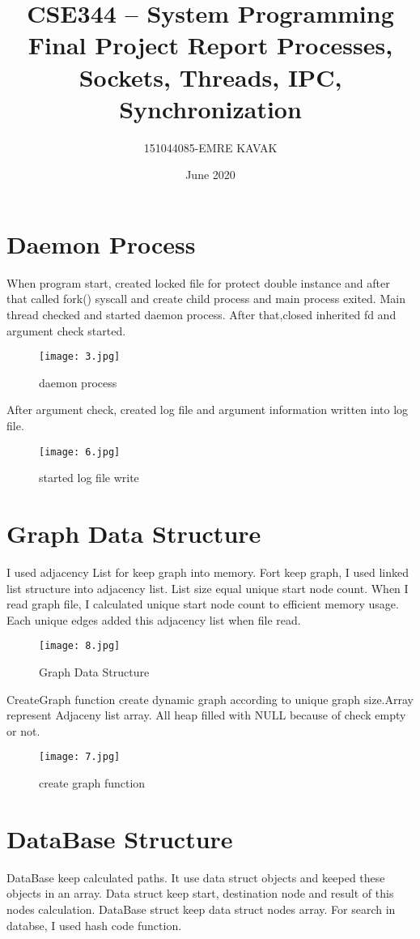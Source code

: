 \documentclass{article}
\title{CSE344 – System Programming Final Project Report Processes, Sockets, Threads, IPC, Synchronization}
\author{151044085-EMRE KAVAK}
\date{June 2020}
\begin{document}
\maketitle

\section{Daemon Process}
 When program start, created locked file for protect double instance and after that called fork() syscall and create child process and  main process exited. Main thread checked and started daemon process. After that,closed inherited fd and  argument check started.

\begin{figure}[h!] 
    \centering
    \texttt{[image: 3.jpg]}
    \caption{daemon process}
\end{figure}

After argument check, created log file and argument information written into log file.

\begin{figure}[h!]
    \centering
    \texttt{[image: 6.jpg]}
    \caption{started log file write}
    \label{fig:e}
\end{figure} 
\newpage

\section{Graph Data Structure}
I used adjacency List for keep graph into memory. Fort keep graph, I used linked list structure into adjacency list.  List size equal unique start node count. When I read graph file, I calculated unique start node count to efficient memory usage. Each unique edges added this adjacency list when file read.

\begin{figure}[h!] 
    \centering
    \texttt{[image: 8.jpg]}
    \caption{Graph Data Structure}
\end{figure}
CreateGraph function create dynamic graph according to  unique graph size.Array represent Adjaceny list array. All heap filled with NULL because of check empty or not. 
\begin{figure}[h!] 
    \centering
    \texttt{[image: 7.jpg]}
    \caption{create graph function}
\end{figure}


\section{DataBase Structure}
DataBase keep calculated paths. It use data struct objects and keeped these objects in an array. Data struct keep start, destination node and result of this nodes calculation. DataBase struct keep data struct nodes array. For search in databse, I used hash code function.
\end{document}
